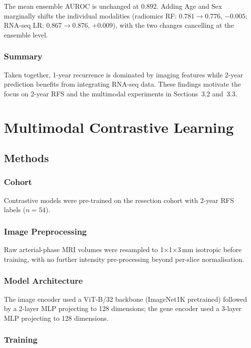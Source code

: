 \documentclass[12pt,twoside]{report}
\begin{document}
The mean ensemble AUROC is unchanged at $0.892$.
Adding Age and Sex marginally shifts the individual modalities (radiomics RF: $0.781 \to 0.776$,
$-0.005$; RNA-seq LR: $0.867 \to 0.876$, $+0.009$), with the two changes cancelling at the
ensemble level.

\subsubsection*{Summary}
Taken together, 1-year recurrence is dominated by imaging features while 2-year prediction
benefits from integrating RNA-seq data.
These findings motivate the focus on 2-year RFS and the multimodal experiments
in Sections~3.2 and~3.3.

\section{Multimodal Contrastive Learning}

\subsection*{Methods}

\subsubsection*{Cohort}

Contrastive models were pre-trained on the resection cohort with 2-year RFS labels ($n=54$).

\subsubsection*{Image Preprocessing}

Raw arterial-phase MRI volumes were resampled to
1$\times$1$\times$3\,mm isotropic before training, with no further intensity pre-processing
beyond per-slice normalisation.

\subsubsection*{Model Architecture}

The image encoder used a ViT-B/32 backbone (ImageNet1K pretrained) followed by a 2-layer MLP
projecting to 128 dimensions; the gene encoder used a 3-layer MLP projecting to 128 dimensions.

\subsubsection*{Training}
\end{document}
